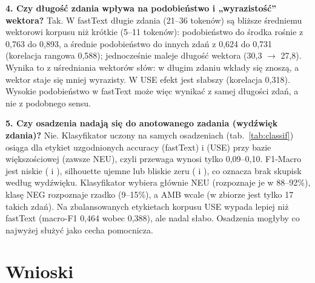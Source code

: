 \documentclass[11pt,a4paper]{article}
\begin{document}
\textbf{4. Czy długość zdania wpływa na podobieństwo i „wyrazistość'' wektora?} Tak. W fastText długie zdania (21--36
tokenów) są bliższe średniemu wektorowi korpusu niż krótkie (5--11 tokenów): podobieństwo do środka rośnie z 0,763 do
0,893, a średnie podobieństwo do innych zdań z 0,624 do 0,731 (korelacja rangowa 0,588); jednocześnie maleje długość
wektora (30,3 $\to$ 27,8). Wynika to z uśredniania wektorów słów: w długim zdaniu wkłady się znoszą, a wektor staje się
mniej wyrazisty. W USE efekt jest słabszy (korelacja 0,318). Wysokie podobieństwo w fastText może więc wynikać z samej
długości zdań, a nie z podobnego sensu.

\textbf{5. Czy osadzenia nadają się do anotowanego zadania (wydźwięk zdania)?} Nie. Klasyfikator uczony na samych
osadzeniach (tab.~\ref{tab:classif}) osiąga dla etykiet uzgodnionych accuracy \accFasttext{} (fastText) i \accUse{} (USE)
przy bazie większościowej \baseUse{} (zawsze NEU), czyli przewaga wynosi tylko 0,09--0,10. F1-Macro jest niskie
(\foneFasttext{} i \foneUse{}), silhouette ujemne lub bliskie zeru (\silFasttext{} i \silUse{}), co oznacza brak
skupisk według wydźwięku. Klasyfikator wybiera głównie NEU (rozpoznaje je w 88--92\%), klasę NEG rozpoznaje rzadko
(9--15\%), a AMB wcale (w zbiorze jest tylko 17 takich zdań). Na zbalansowanych etykietach korpusu USE wypada lepiej
niż fastText (macro-F1 0,464 wobec 0,388), ale nadal słabo. Osadzenia mogłyby co najwyżej służyć jako cecha pomocnicza.

\begin{table}[H]
\centering\small
\resizebox{\textwidth}{!}{}
\caption{Klasyfikacja wydźwięku zdania na samych osadzeniach (regresja logistyczna, 5-krotna walidacja krzyżowa).
„Baza większ.'' to accuracy klasyfikatora zawsze wybierającego najliczniejszą klasę, „losowy'' to losowanie zgodne
z rozkładem klas (odniesienie dla kNN-10, czyli odsetka sąsiadów tej samej klasy).}
\label{tab:classif}
\end{table}


\section{Wnioski}
\end{document}

